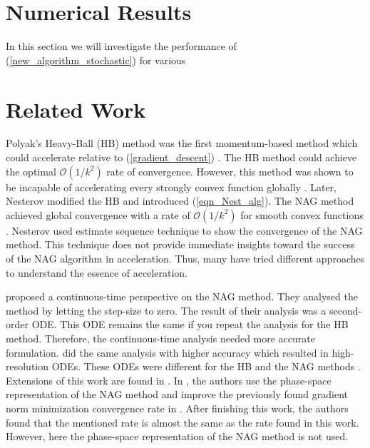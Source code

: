 \documentclass{article}
\theoremstyle{plain}
\theoremstyle{definition}
\theoremstyle{remark}
\begin{document}
\section{Numerical Results}\label{sec_numerical}
In this section we will investigate the performance of (\ref{new_algorithm_stochastic}) for various 





\section{Related Work}\label{sec_relwork}
Polyak's Heavy-Ball (HB) method was the first momentum-based method which could accelerate relative to (\ref{gradient_descent}) \cite{Polyak1963GradientMF}. The HB method could achieve the optimal $\mathcal{O}(1/k^2)$ rate of convergence. However, this method was shown to be incapable of accelerating every strongly convex function globally \cite{Lessard2016AnalysisAD}. Later, Nesterov modified the HB and introduced (\ref{eqn_Nest_alg}). The NAG method achieved global convergence with a rate of $\mathcal{O}(1/k^2)$ for smooth convex functions \cite{Nesterov1983AMF}. Nesterov used estimate sequence technique to show the convergence of the NAG method. This technique does not provide immediate insights toward the success of the NAG algorithm in acceleration. Thus, many have tried different approaches to understand the essence of acceleration. \par
\cite{JMLR:v17:15-084} proposed a continuous-time perspective on the NAG method. They analysed the method by letting the step-size to zero. The result of their analysis was a second-order ODE. This ODE remains the same if you repeat the analysis for the HB method. Therefore, the continuous-time analysis needed more accurate formulation. \cite{Shi2021UnderstandingTA} did the same analysis with higher accuracy which resulted in high-resolution ODEs. These ODEs were different for the HB and the NAG methods \cite{shi2019acceleration}. Extensions of this work are found in \cite{chen2022gradient,chen2022accelerating}. In \cite{chen2022gradient}, the authors use the phase-space representation of the NAG method and improve the previously found gradient norm minimization convergence rate in \cite{Shi2021UnderstandingTA}. After finishing this work, the authors found that the mentioned rate is almost the same as the rate found in this work. However, here the phase-space representation of the NAG method is not used. \par 
\end{document}
